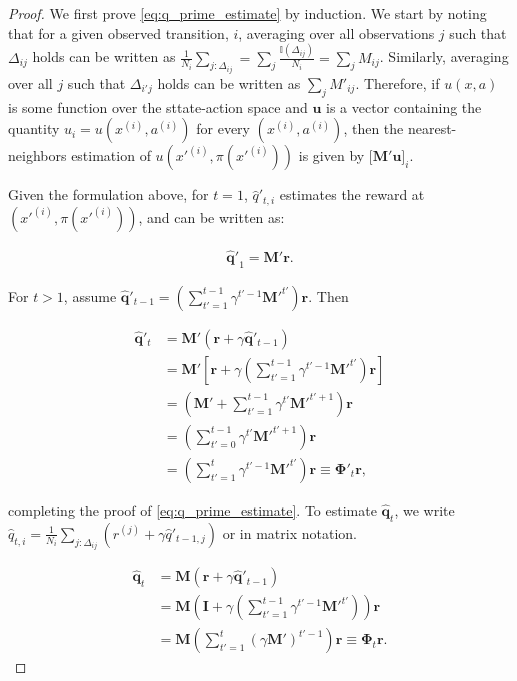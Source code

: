 \documentclass{article}
\begin{document}
\begin{proof}

We first prove \ref{eq:q_prime_estimate} by induction. We start by noting that for a given observed transition, $i$, averaging over all observations $j$ such that $\Delta_{ij}$ holds can be written as $\frac{1}{N_i}\sum_{j:\Delta_{ij}} = \sum_{j} \frac{\mathbb{I}({\Delta_{ij}})}{N_i} = \sum_{j} M_{ij}$. Similarly, averaging over all $j$ such that $\Delta_{i'j}$ holds can be written as $\sum_{j} M'_{ij}$. Therefore, if $u(x, a)$ is some function over the sttate-action space and $\mathbf{u}$ is a vector containing the quantity $u_i = u(x^{(i)}, a^{(i)})$ for every $(x^{(i)}, a^{(i)})$, then the nearest-neighbors estimation of $u(x'^{(i)}, \pi(x'^{(i)}))$ is given by $\lbrack \mathbf{M}'\mathbf{u} \rbrack_i$.

Given the formulation above, for $t=1$, $\hat{q}'_{t,i}$ estimates the reward at $(x'^{(i)}, \pi(x'^{(i)}))$, and can be written as:

\begin{align}
    \mathbf{\hat{q}'}_1 = \mathbf{M}' \mathbf{r}.
\end{align}

For $t > 1$, assume $\mathbf{\hat{q}}'_{t-1} = \left( \sum_{t'=1}^{t-1} \gamma^{t'-1} \mathbf{M}'^{t'} \right) \mathbf{r}$. Then

\begin{align}
    \mathbf{\hat{q}}'_t &= \mathbf{M}' \left( \mathbf{r} + \gamma \mathbf{\hat{q}}'_{t-1} \right) \\ \nonumber
    &= \mathbf{M}' \left[ \mathbf{r} + \gamma \left( \sum_{t'=1}^{t-1} \gamma^{t'-1} \mathbf{M}'^{t'} \right) \mathbf{r} \right] \\ \nonumber
    &= \left( \mathbf{M}' + \sum_{t'=1}^{t-1} \gamma^{t'} \mathbf{M}'^{t'+1} \right) \mathbf{r} \\ \nonumber
    &= \left(\sum_{t'=0}^{t-1} \gamma^{t'} \mathbf{M}'^{t'+1} \right) \mathbf{r} \\ \nonumber
    &= \left( \sum_{t'=1}^{t} \gamma^{t'-1} \mathbf{M}'^{t'} \right) \mathbf{r} \equiv \mathbf{\Phi}'_t \mathbf{r},
\end{align}

completing the proof of \ref{eq:q_prime_estimate}. To estimate $\mathbf{\hat{q}}_t$, we write $\hat{q}_{t,i} = \frac{1}{N_i}\sum_{j:\Delta_{ij}} \left( r^{(j)} + \gamma \hat{q}'_{t-1,j} \right)$ or in matrix notation.

\begin{align}
    \mathbf{\hat{q}}_t &= \mathbf{M} \left( \mathbf{r} + \gamma \mathbf{\hat{q}}'_{t-1} \right)\\ \nonumber
    &= \mathbf{M} \left( \mathbf{I} + \gamma \left( \sum_{t'=1}^{t-1} \gamma^{t'-1} \mathbf{M}'^{t'} \right) \right) \mathbf{r} \\ \nonumber
    &= \mathbf{M} \left( \sum_{t'=1}^{t} \left( \gamma \mathbf{M}' \right)^{t'-1} \right) \mathbf{r} \equiv \mathbf{\Phi}_t \mathbf{r}. 
\end{align}

\end{proof}
\end{document}
